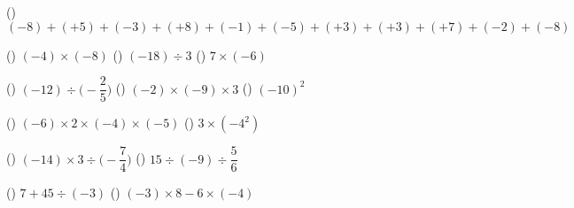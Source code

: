 \documentclass[
  12pt,a4paper,lualatex,ja=standard]{bxjsarticle}
\begin{document}
\vfill

()\hspace{2.5pt} \((-8) + (+5) + (-3) + (+8) + (-1) + (-5) + (+3) + (+3) + (+7) + (-2) + (-8)\)

\vfill

()\hspace{2.5pt} \((-4) \times (-8)\) \hspace{30mm}
()\hspace{2.5pt} \((-18) \div 3\) \hspace{30mm}
()\hspace{2.5pt} \(7 \times (-6)\)

\vfill

()\hspace{2.5pt} \((-12) \div \biggl(-\dfrac{2}{5} \biggl)\)
\hspace{30mm} ()\hspace{2.5pt} \((-2) \times (-9) \times 3\)
\hspace{30mm} ()\hspace{2.5pt} \((-10)^2\)

\vfill

()\hspace{2.5pt} \((-6) \times 2 \times (-4) \times (-5)\)
\hspace{30mm} ()\hspace{2.5pt} \(3 \times (-4^2)\)

\vfill

()\hspace{2.5pt} \((-14) \times 3 \div \biggl(-\dfrac{7}{4} \biggl)\)
\hspace{30mm} ()\hspace{2.5pt} \(15 \div (-9) \div \dfrac{5}{6}\)

\vfill

()\hspace{2.5pt} \(7 + 45 \div (-3)\) \hspace{50mm}
()\hspace{2.5pt} \((-3) \times 8 - 6 \times (-4)\)
\end{document}
